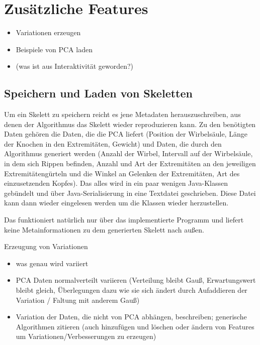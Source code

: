 \chapter{Zusätzliche Features}

\begin{itemize}
 \item Variationen erzeugen
 \item Beispiele von PCA laden
 \item (was ist aus Interaktivität geworden?)
\end{itemize}


\section{Speichern und Laden von Skeletten}

Um ein Skelett zu speichern reicht es jene Metadaten herauszuschreiben, aus denen der Algorithmus das Skelett wieder reproduzieren kann. Zu den benötigten Daten gehören die Daten, die die PCA liefert (Position der Wirbelsäule, Länge der Knochen in den Extremitäten, Gewicht) und Daten, die durch den Algorithmus generiert werden (Anzahl der Wirbel, Intervall auf der Wirbelsäule, in dem sich Rippen befinden, Anzahl und Art der Extremitäten an den jeweiligen Extremitätengürteln und die Winkel an Gelenken der Extremitäten, Art des einzusetzenden Kopfes).
Das alles wird in ein paar wenigen Java-Klassen gebündelt und über Java-Serialisierung in eine Textdatei geschrieben. Diese Datei kann dann wieder eingelesen werden um die Klassen wieder herzustellen.

Das funktioniert natürlich nur über das implementierte Programm und liefert keine Metainformationen zu dem generierten Skelett nach außen.


Erzeugung von Variationen 
\begin{itemize}
 \item was genau wird variiert
 \item PCA Daten normalverteilt variieren (Verteilung bleibt Gauß, Erwartungswert bleibt gleich, Überlegungen dazu wie sie sich ändert durch Aufaddieren der Variation / Faltung mit anderem Gauß)
 \item Variation der Daten, die nicht von PCA abhängen, beschreiben; generische Algorithmen zitieren (auch hinzufügen und löschen oder ändern von Features um Variationen/Verbesserungen zu erzeugen)
\end{itemize}


